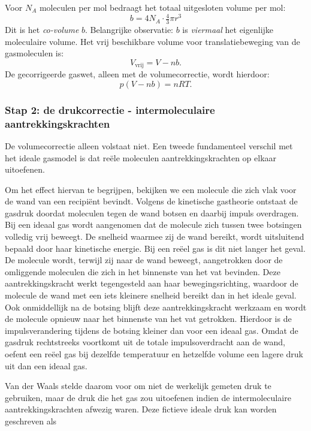 Voor $N_A$ moleculen per mol bedraagt het totaal uitgesloten volume per mol:
\begin{equation*}
b = 4 N_A \cdot \tfrac{4}{3}\pi r^3
\end{equation*}
Dit is het \emph{co-volume} $b$. Belangrijke observatie: $b$ is \emph{viermaal} het eigenlijke moleculaire volume. Het vrij beschikbare volume voor translatiebeweging van de gasmoleculen is:
\begin{equation*}
V_{\text{vrij}} = V - nb.
\end{equation*}
De gecorrigeerde gaswet, alleen met de volumecorrectie, wordt hierdoor:
\begin{equation}
p(V - nb) = nRT.
\end{equation}

\subsubsection{Stap 2: de drukcorrectie - intermoleculaire aantrekkingskrachten}

De volumecorrectie alleen volstaat niet. Een tweede fundamenteel verschil met het ideale gasmodel is dat re\"ele moleculen aantrekkingskrachten op elkaar uitoefenen.

Om het effect hiervan te begrijpen, bekijken we een molecule die zich vlak voor de wand van een recipiënt bevindt. Volgens de kinetische gastheorie ontstaat de gasdruk doordat moleculen tegen de wand botsen en daarbij impuls overdragen. Bij een ideaal gas wordt aangenomen dat de molecule zich tussen twee botsingen volledig vrij beweegt. De snelheid waarmee zij de wand bereikt, wordt uitsluitend bepaald door haar kinetische energie. Bij een reëel gas is dit niet langer het geval. De molecule wordt, terwijl zij naar de wand beweegt, aangetrokken door de omliggende moleculen die zich in het binnenste van het vat bevinden. Deze aantrekkingskracht werkt tegengesteld aan haar bewegingsrichting, waardoor de molecule de wand met een iets kleinere snelheid bereikt dan in het ideale geval. Ook onmiddellijk na de botsing blijft deze aantrekkingskracht werkzaam en wordt de molecule opnieuw naar het binnenste van het vat getrokken. Hierdoor is de impulsverandering tijdens de botsing kleiner dan voor een ideaal gas. Omdat de gasdruk rechtstreeks voortkomt uit de totale impulsoverdracht aan de wand, oefent een reëel gas bij dezelfde temperatuur en hetzelfde volume een lagere druk uit dan een ideaal gas.

Van der Waals stelde daarom voor om niet de werkelijk gemeten druk te gebruiken, maar de druk die het gas zou uitoefenen indien de intermoleculaire aantrekkingskrachten afwezig waren. Deze fictieve ideale druk kan worden geschreven als

